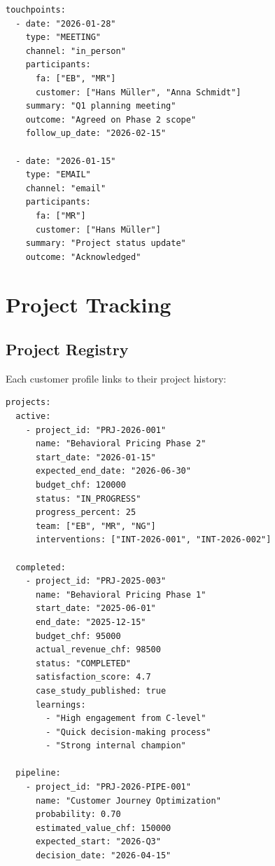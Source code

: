 \begin{verbatim}
touchpoints:
  - date: "2026-01-28"
    type: "MEETING"
    channel: "in_person"
    participants:
      fa: ["EB", "MR"]
      customer: ["Hans Müller", "Anna Schmidt"]
    summary: "Q1 planning meeting"
    outcome: "Agreed on Phase 2 scope"
    follow_up_date: "2026-02-15"

  - date: "2026-01-15"
    type: "EMAIL"
    channel: "email"
    participants:
      fa: ["MR"]
      customer: ["Hans Müller"]
    summary: "Project status update"
    outcome: "Acknowledged"
\end{verbatim}


\section{Project Tracking}
\label{sec:bp-projects}

\subsection{Project Registry}

Each customer profile links to their project history:

\begin{verbatim}
projects:
  active:
    - project_id: "PRJ-2026-001"
      name: "Behavioral Pricing Phase 2"
      start_date: "2026-01-15"
      expected_end_date: "2026-06-30"
      budget_chf: 120000
      status: "IN_PROGRESS"
      progress_percent: 25
      team: ["EB", "MR", "NG"]
      interventions: ["INT-2026-001", "INT-2026-002"]

  completed:
    - project_id: "PRJ-2025-003"
      name: "Behavioral Pricing Phase 1"
      start_date: "2025-06-01"
      end_date: "2025-12-15"
      budget_chf: 95000
      actual_revenue_chf: 98500
      status: "COMPLETED"
      satisfaction_score: 4.7
      case_study_published: true
      learnings:
        - "High engagement from C-level"
        - "Quick decision-making process"
        - "Strong internal champion"

  pipeline:
    - project_id: "PRJ-2026-PIPE-001"
      name: "Customer Journey Optimization"
      probability: 0.70
      estimated_value_chf: 150000
      expected_start: "2026-Q3"
      decision_date: "2026-04-15"
\end{verbatim}

